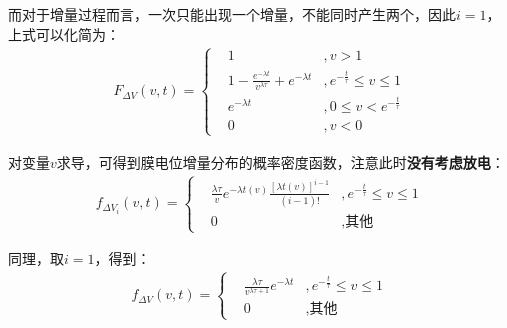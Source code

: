 \documentclass[11pt]{article}
\begin{document}
而对于增量过程而言，一次只能出现一个增量，不能同时产生两个，因此$i=1$，上式可以化简为：
\begin{align}
  F_{\Delta V}(v,t) =\left\{\begin{aligned}
                                & 1                                                                     & ,v>1                              \\
                                & \displaystyle 1-\frac{e^{-\lambda t}}{v^{\lambda\tau}}+e^{-\lambda t} & , e^{-\frac{t}{\tau}} \le v \le 1 \\
                                & e^{-\lambda t}                                                        & ,0\le v<e^{-\frac{t}{\tau}}\\
                                & 0                                                                     & ,v<0
                             \end{aligned}\right.\label{eq:膜电位增量的分布}
\end{align}\par
对变量$v$求导，可得到膜电位增量分布的概率密度函数，注意此时\textbf{没有考虑放电}：
\begin{align}
  f_{\Delta V_i}(v,t)=\left\{
  \begin{aligned}
     & \displaystyle\frac{\lambda\tau}{v}e^{-\lambda t(v)}\frac{[\lambda t(v)]^{i-1}}{(i-1)!} & ,e^{-\frac{t}{\tau}} \le v \le 1 \\
     & 0                                                                                      & ,\textrm{其他}
  \end{aligned}
  \right.
\end{align}\par
同理，取$i=1$，得到：
\begin{align}
  f_{\Delta V}(v,t)=\left\{
  \begin{aligned}
     & \frac{\lambda\tau}{v^{\lambda \tau+1}}e^{-\lambda t} & ,e^{-\frac{t}{\tau}} \le v \le 1 \\
     & 0                                                    & ,\textrm{其他}
  \end{aligned}
  \right.\label{eq:膜电位增量的概率密度函数}
\end{align}\par
\end{document}
